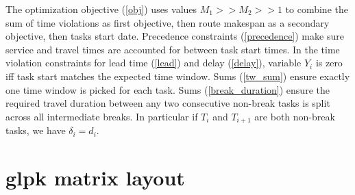 \documentclass{article}
\begin{document}
The optimization objective (\ref{obj}) uses values $M_1 >> M_2 >> 1$
to combine the sum of time violations as first objective, then route
makespan as a secondary objective, then tasks start date. Precedence
constraints (\ref{precedence}) make sure service and travel times are
accounted for between task start times. In the time violation
constraints for lead time (\ref{lead}) and delay (\ref{delay}),
variable $Y_i$ is zero iff task start matches the expected time
window. Sums (\ref{tw_sum}) ensure exactly one time window is picked
for each task. Sums (\ref{break_duration}) ensure the required travel
duration between any two consecutive non-break tasks is split across
all intermediate breaks. In particular if $T_i$ and $T_{i + 1}$ are
both non-break tasks, we have $\delta_i = d_i$.

\section{glpk matrix layout}

\setcounter{MaxMatrixCols}{30}
\end{document}
